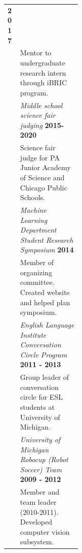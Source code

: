 \documentclass{article}
\begin{document}
\begin{longtable}{@{}>{\raggedleft}p{0.17\linewidth}
     p{}@{}}
    \hfill\textbf{2017}\\
  & Mentor to undergraduate research intern through iBRIC program.\\[0.5em]
  & \textit{Middle school science fair judging}
    \hfill\textbf{2015-2020}\\
  & Science fair judge for PA Junior Academy of Science and Chicago Public Schools.\\[0.5em]
  & \textit{Machine Learning Department Student Research Symposium}
    \hfill\textbf{2014}\\
  & Member of organizing committee. Created website and helped plan symposium.\\[0.5em]
  & \textit{English Language Institute Conversation Circle Program}
    \hfill\textbf{2011 - 2013}\\
  & Group leader of conversation circle for ESL students at University of Michigan.\\[0.5em]
  & \textit{University of Michigan Robocup (Robot Soccer) Team}
    \hfill\textbf{2009 - 2012}\\
  & Member and team leader (2010-2011). Developed computer vision subsystem.\\[1.5em]
\end{longtable}
\end{document}
